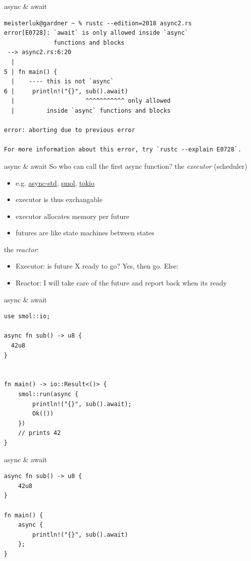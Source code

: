 \documentclass{beamer}
\begin{document}
\begin{frame}[fragile]{async \& await}
  \begin{verbatim}
meisterluk@gardner ~ % rustc --edition=2018 async2.rs
error[E0728]: `await` is only allowed inside `async`
              functions and blocks
 --> async2.rs:6:20
  |
5 | fn main() {
  |    ---- this is not `async`
6 |     println!("{}", sub().await)
  |                    ^^^^^^^^^^^ only allowed
  |         inside `async` functions and blocks

error: aborting due to previous error

For more information about this error, try `rustc --explain E0728`.
  \end{verbatim}
\end{frame}

\begin{frame}[fragile]{async \& await}
  So who can call the first async function? the \emph{executor} (scheduler)
  \begin{itemize}
    \item e.g. \href{https://crates.io/crates/async-std}{async-std}, \href{https://crates.io/crates/smol}{smol}, \href{https://crates.io/crates/tokio}{tokio}
    \item executor is thus exchangable
    \item executor allocates memory per future
    \item futures are like state machines between states
  \end{itemize}
  the \emph{reactor}:
  \begin{itemize}
    \item Executor: is future X ready to go? Yes, then go. Else:
    \item Reactor: I will take care of the future and report back when its ready
  \end{itemize}
\end{frame}

\begin{frame}[fragile]{async \& await}
  \begin{verbatim}
use smol::io;
  
async fn sub() -> u8 {
  42u8
}


fn main() -> io::Result<()> {
    smol::run(async {
        println!("{}", sub().await);
        Ok(())
    })
    // prints 42
}
  \end{verbatim}
\end{frame}

\begin{frame}[fragile]{async \& await}
  \begin{verbatim}
async fn sub() -> u8 {
    42u8
}

fn main() {
    async {
        println!("{}", sub().await)
    };
}
  \end{verbatim}
\end{frame}
\end{document}
